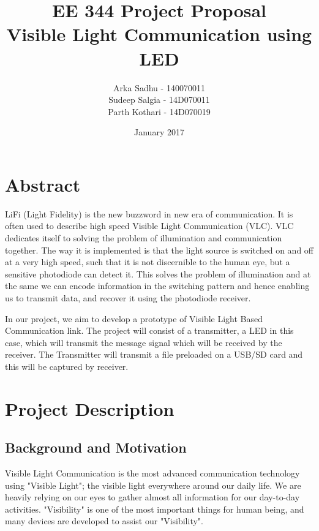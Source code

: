 \documentclass{article}
\title{EE 344 Project Proposal \\ Visible Light Communication using LED}
\author{
  Arka Sadhu - 140070011\\
  Sudeep Salgia - 14D070011\\
  Parth Kothari - 14D070019\\
}
\date{January 2017}
\begin{document}
\maketitle

\tableofcontents
\newpage
\section{Abstract}
LiFi (Light Fidelity) is the new buzzword in new era of communication. It is often used to describe high speed Visible Light Communication (VLC). VLC dedicates itself to solving the problem of illumination and communication together. The way it is implemented is that the light source is switched on and off at a very high speed, such that it is not discernible to the human eye, but a sensitive photodiode can detect it. This solves the problem of illumination and at the same we can encode information in the switching pattern and hence enabling us to transmit data, and recover it using the photodiode receiver.

In our project, we aim to develop a prototype of Visible Light Based Communication link. The project will consist of a transmitter, a LED in this case, which will transmit the message signal which will be received by the receiver. The Transmitter will transmit a file preloaded on a USB/SD card and this will be captured by receiver. 

\section{Project Description}
\subsection{Background and Motivation}
Visible Light Communication is the most advanced communication technology using "Visible Light"; the visible light everywhere around our daily life. We are heavily relying on our eyes to gather almost all information for our day-to-day activities. "Visibility" is one of the most important things for human being, and many devices are developed to assist our "Visibility". 
\end{document}
